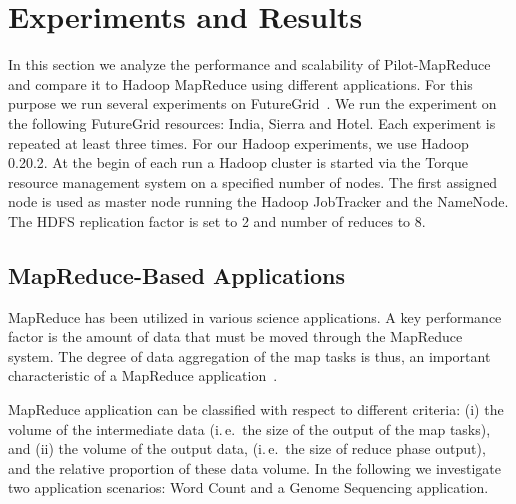\documentclass{acm_proc_article-sp}
\newcommand{\jhanote}[1]{ {\textcolor{red} { ***SJ: #1 }}}
\newcommand{\alnote}[1]{ {\textcolor{blue} { ***andreL: #1 }}}
\newcommand{\alnote}[1]{}
\newcommand{\jhanote}[1]{}
\newcommand{\upp}{\vspace*{-0.5em}}
\newcommand{\pilotmapreduce}{Pilot-MapReduce\xspace}
\begin{document}
\section{Experiments and Results}
\label{sec-experiments}


In this section we analyze the performance and scalability of
\pilotmapreduce and compare it to Hadoop MapReduce using different
applications. For this purpose we run several experiments on
FutureGrid~\cite{fg}. We run the experiment on the following
FutureGrid resources: India, Sierra and Hotel. Each experiment is
repeated at least three times. For our Hadoop experiments, we use
Hadoop 0.20.2. At the begin of each run a Hadoop cluster is started
via the Torque resource management system on a specified number of
nodes. The first assigned node is used as master node running the
Hadoop JobTracker and the NameNode. The HDFS replication factor is set
to 2 and number of reduces to 8.
\upp
\subsection{MapReduce-Based Applications}

MapReduce has been utilized in various science applications. A key performance 
factor is the amount of data that must be moved through the MapReduce system. 
The degree of data aggregation of the map tasks is thus, an important 
characteristic of a MapReduce application~\cite{weissman-mr-11}.

MapReduce application can be classified with respect to different
criteria: (i) the volume of the intermediate data (i.\,e.\ the size of
the output of the map tasks), and (ii) the volume of the output data,
(i.\,e.\ the size of reduce phase output), and the relative proportion
of these data volume. In the following we investigate two application
scenarios: Word Count and a Genome Sequencing application.

\end{document}
